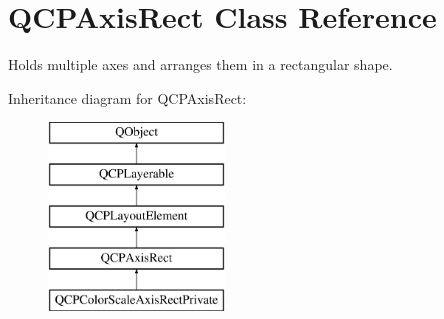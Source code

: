 \hypertarget{class_q_c_p_axis_rect}{}\section{Q\+C\+P\+Axis\+Rect Class Reference}
\label{class_q_c_p_axis_rect}


Holds multiple axes and arranges them in a rectangular shape.  


Inheritance diagram for Q\+C\+P\+Axis\+Rect\+:\begin{figure}[H]
\begin{center}
\leavevmode
\includegraphics[height=5.000000cm]{class_q_c_p_axis_rect}
\end{center}
\end{figure}
